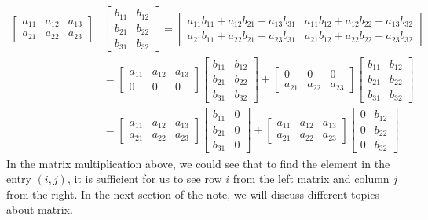\documentclass[../main.tex]{subfiles}
\begin{document}
\begin{align*}
\begin{bmatrix}
    a_{11} & a_{12} & a_{13} \\
    a_{21} & a_{22} & a_{23}
\end{bmatrix}
&\begin{bmatrix}
    b_{11} & b_{12} \\
    b_{21} & b_{22} \\
    b_{31} & b_{32}
\end{bmatrix}
=
\begin{bmatrix}
    a_{11} b_{11} + a_{12} b_{21} + a_{13} b_{31} &
    a_{11} b_{12} + a_{12} b_{22} + a_{13} b_{32} \\
    a_{21} b_{11} + a_{22} b_{21} + a_{23} b_{31} &
    a_{21} b_{12} + a_{22} b_{22} + a_{23} b_{32}
\end{bmatrix} \\
&=
\begin{bmatrix}
    a_{11} & a_{12} & a_{13} \\
    0      & 0      & 0
\end{bmatrix}
\begin{bmatrix}
    b_{11} & b_{12} \\
    b_{21} & b_{22} \\
    b_{31} & b_{32}
\end{bmatrix}
+
\begin{bmatrix}
    0      & 0      & 0 \\
    a_{21} & a_{22} & a_{23}
\end{bmatrix}
\begin{bmatrix}
    b_{11} & b_{12} \\
    b_{21} & b_{22} \\
    b_{31} & b_{32}
\end{bmatrix} \\
&=
\begin{bmatrix}
    a_{11} & a_{12} & a_{13} \\
    a_{21} & a_{22} & a_{23}
\end{bmatrix}
\begin{bmatrix}
    b_{11} & 0 \\
    b_{21} & 0 \\
    b_{31} & 0
\end{bmatrix}
+
\begin{bmatrix}
    a_{11} & a_{12} & a_{13} \\
    a_{21} & a_{22} & a_{23}
\end{bmatrix}
\begin{bmatrix}
    0 & b_{12} \\
    0 & b_{22} \\
    0 & b_{32}
\end{bmatrix}
\end{align*}
In the matrix multiplication above, we could see that to find
the element in the entry $(i, j)$, it is sufficient for us to
see row $i$ from the left matrix and column $j$ from the right.
In the next section of the note, we will discuss different
topics about matrix.
\end{document}

